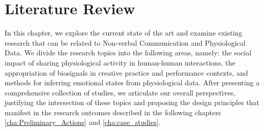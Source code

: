 

\chapter{Literature Review}
\label{cha:lit_review}

In this chapter, we explore the current state of the art and examine existing research that can be related to Non-verbal Communication and Physiological Data. We divide the research topics into the following areas, namely: the social impact of sharing physiological activity in human-human interactions, the appropriation of biosignals in creative practice and performance contexts, and methods for inferring emotional states from physiological data. After presenting a comprehensive collection of studies, we articulate our overall perspectives, justifying the intersection of these topics and proposing the design principles that manifest in the research outcomes described in the following chapters \ref{cha:Preliminary_Actions} and \ref{cha:case_studies}.

